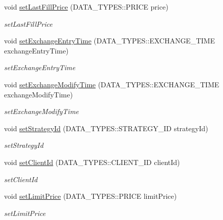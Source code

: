 \begin{DoxyCompactItemize}
void \hyperlink{class_a_p_i2_1_1_order_confirmation_a5f5e55d7d02d6d45f6a536b140fe8d46}{set\-Last\-Fill\-Price} (D\-A\-T\-A\-\_\-\-T\-Y\-P\-E\-S\-::\-P\-R\-I\-C\-E price)
\begin{DoxyCompactList}\small\item\em set\-Last\-Fill\-Price \end{DoxyCompactList}\item 
void \hyperlink{class_a_p_i2_1_1_order_confirmation_ad38f4ef7be23cfa5da1f6a29b5930430}{set\-Exchange\-Entry\-Time} (D\-A\-T\-A\-\_\-\-T\-Y\-P\-E\-S\-::\-E\-X\-C\-H\-A\-N\-G\-E\-\_\-\-T\-I\-M\-E exchange\-Entry\-Time)
\begin{DoxyCompactList}\small\item\em set\-Exchange\-Entry\-Time \end{DoxyCompactList}\item 
void \hyperlink{class_a_p_i2_1_1_order_confirmation_ab94a69f628a2242c95f3dc6f044e5382}{set\-Exchange\-Modify\-Time} (D\-A\-T\-A\-\_\-\-T\-Y\-P\-E\-S\-::\-E\-X\-C\-H\-A\-N\-G\-E\-\_\-\-T\-I\-M\-E exchange\-Modify\-Time)
\begin{DoxyCompactList}\small\item\em set\-Exchange\-Modify\-Time \end{DoxyCompactList}\item 
void \hyperlink{class_a_p_i2_1_1_order_confirmation_a765247f634969cae00acbe03f25e7723}{set\-Strategy\-Id} (D\-A\-T\-A\-\_\-\-T\-Y\-P\-E\-S\-::\-S\-T\-R\-A\-T\-E\-G\-Y\-\_\-\-I\-D strategy\-Id)
\begin{DoxyCompactList}\small\item\em set\-Strategy\-Id \end{DoxyCompactList}\item 
void \hyperlink{class_a_p_i2_1_1_order_confirmation_a59c762761ec0e600a3e4cc7a3aa9cded}{set\-Client\-Id} (D\-A\-T\-A\-\_\-\-T\-Y\-P\-E\-S\-::\-C\-L\-I\-E\-N\-T\-\_\-\-I\-D client\-Id)
\begin{DoxyCompactList}\small\item\em set\-Client\-Id \end{DoxyCompactList}\item 
void \hyperlink{class_a_p_i2_1_1_order_confirmation_abe10f6a4ceadb9bf7f79de449fb21729}{set\-Limit\-Price} (D\-A\-T\-A\-\_\-\-T\-Y\-P\-E\-S\-::\-P\-R\-I\-C\-E limit\-Price)
\begin{DoxyCompactList}\small\item\em set\-Limit\-Price \end{DoxyCompactList}\item 

\end{DoxyCompactItemize}
